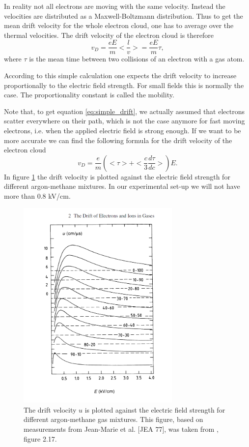 \documentclass[12pt]{article}
\begin{document}
In reality not all electrons are moving with the same velocity. Instead the velocities are distributed as a Maxwell-Boltzmann distribution. Thus to get the mean drift velocity for the whole electron cloud, one has to average over the thermal velocities. The drift velocity of the electron cloud is therefore
\begin{equation} \label{eq:simple_drift}
v_D = \frac{eE}{m} < \frac{l}{v} > = \frac{eE}{m} \tau,
\end{equation}
where $\tau$ is the mean time between two collisions of an electron with a gas atom.

According to this simple calculation one expects the drift velocity to increase proportionally to the electric field strength. For small fields this is normally the case. The proportionality constant is called the mobility.

Note that, to get equation \eqref{eq:simple_drift}, we actually assumed that electrons scatter everywhere on their path, which is not the case anymore for fast moving electrons, i.e. when the applied electric field is strong enough. If we want to be more accurate we can find the following formula for the drift velocity of the electron cloud
\begin{equation}
    v_D = \frac{e}{m}( < \tau > + < \frac{c}{3}\frac{d\tau}{dc} > ) E.
\end{equation}
In figure \ref{fig:drift_electrons} the drift velocity is plotted against the electric field strength for different argon-methane mixtures. In our experimental set-up we will not have more than $0.8$ kV/cm.
\begin{figure}[h]
    \centering
    \includegraphics[width=8cm]{pics/drift_electrons.png}
    \caption{The drift velocity $u$ is plotted against the electric field strength for different argon-methane gas mixtures. This figure, based on measurements from Jean-Marie et al. [JEA 77], was taken from \cite{DriftChamberBook}, figure 2.17.}
    \label{fig:drift_electrons}
\end{figure}
\end{document}
